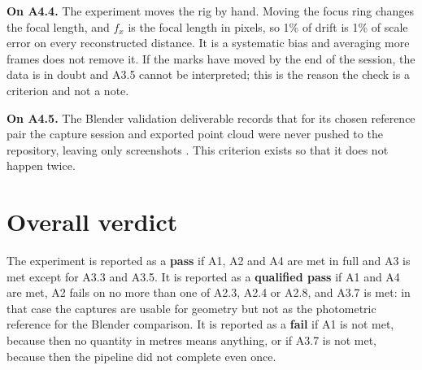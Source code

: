 \textbf{On A4.4.} The experiment moves the rig by hand. Moving the focus ring
changes the focal length, and $f_x$ is the focal length in pixels, so 1\% of
drift is 1\% of scale error on every reconstructed distance. It is a
systematic bias and averaging more frames does not remove it. If the marks
have moved by the end of the session, the data is in doubt and A3.5 cannot be
interpreted; this is the reason the check is a criterion and not a note.

\textbf{On A4.5.} The Blender validation deliverable records that for its
chosen reference pair the capture session and exported point cloud were never
pushed to the repository, leaving only screenshots
\cite{linku_blender_validation}. This criterion exists so that it does not
happen twice.

\section{Overall verdict}

The experiment is reported as a \textbf{pass} if A1, A2 and A4 are met in full
and A3 is met except for A3.3 and A3.5. It is reported as a \textbf{qualified
pass} if A1 and A4 are met, A2 fails on no more than one of A2.3, A2.4 or
A2.8, and A3.7 is met: in that case the captures are usable for geometry but
not as the photometric reference for the Blender comparison. It is reported as
a \textbf{fail} if A1 is not met, because then no quantity in metres means
anything, or if A3.7 is not met, because then the pipeline did not complete
even once.
